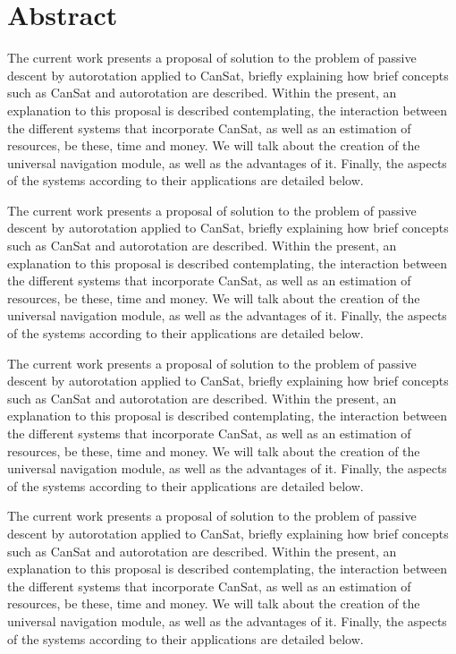 \chapter{Abstract}

The current work presents a proposal of solution to the problem of passive descent by autorotation applied to CanSat, briefly explaining how brief concepts such as CanSat and autorotation are described. Within the present, an explanation to this proposal is described contemplating, the interaction between the different systems that incorporate CanSat, as well as an estimation of resources, be these, time and money. We will talk about the creation of the universal navigation module, as well as the advantages of it. Finally, the aspects of the systems according to their applications are detailed below.

The current work presents a proposal of solution to the problem of passive descent by autorotation applied to CanSat, briefly explaining how brief concepts such as CanSat and autorotation are described. Within the present, an explanation to this proposal is described contemplating, the interaction between the different systems that incorporate CanSat, as well as an estimation of resources, be these, time and money. We will talk about the creation of the universal navigation module, as well as the advantages of it. Finally, the aspects of the systems according to their applications are detailed below.

The current work presents a proposal of solution to the problem of passive descent by autorotation applied to CanSat, briefly explaining how brief concepts such as CanSat and autorotation are described. Within the present, an explanation to this proposal is described contemplating, the interaction between the different systems that incorporate CanSat, as well as an estimation of resources, be these, time and money. We will talk about the creation of the universal navigation module, as well as the advantages of it. Finally, the aspects of the systems according to their applications are detailed below.

The current work presents a proposal of solution to the problem of passive descent by autorotation applied to CanSat, briefly explaining how brief concepts such as CanSat and autorotation are described. Within the present, an explanation to this proposal is described contemplating, the interaction between the different systems that incorporate CanSat, as well as an estimation of resources, be these, time and money. We will talk about the creation of the universal navigation module, as well as the advantages of it. Finally, the aspects of the systems according to their applications are detailed below.

